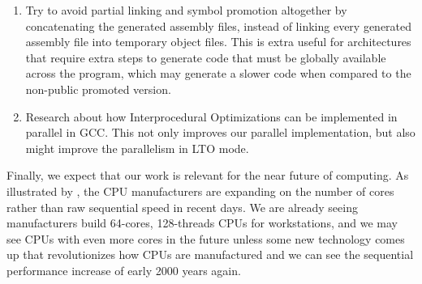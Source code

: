 \begin{enumerate}
\item Try to avoid partial linking and symbol promotion altogether by
concatenating the generated assembly files, instead of linking every generated
assembly file into temporary object files. This is extra useful for
architectures that require extra steps to generate code that must be globally
available across the program, which may generate a slower code when compared to
the non-public promoted version.

\item Research about how Interprocedural Optimizations can be implemented
in parallel in GCC. This not only improves our parallel implementation,
but also might improve the parallelism in LTO mode.

\end{enumerate}

Finally, we expect that our work is relevant for the near future of computing.
As illustrated by \cite{42years}, the CPU manufacturers are expanding on the
number of cores rather than raw sequential speed in recent days. We are already
seeing manufacturers build 64-cores, 128-threads CPUs for workstations, and we
may see CPUs with even more cores in the future unless some new technology
comes up that revolutionizes how CPUs are manufactured and we can see the
sequential performance increase of early 2000 years again.

